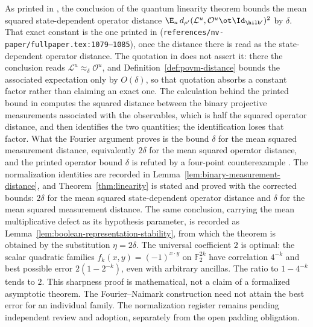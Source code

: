 \begin{remark}
	\label{rem:linearity-distance-normalization}
	As printed in \cite{Natarajan2017Linearity}, the conclusion of the quantum
	linearity theorem bounds the mean squared state-dependent operator distance
	$\E_u \, d_{\rho'}(\mathcal{L}^u, \mathcal{O}^u \ot \Id_{\hilb'})^2$ by
	$\delta$. That exact constant is the one printed in
	\cite[Theorem~10]{Natarajan2017Linearity}
	(\texttt{references/nv-paper/fullpaper.tex:1079--1085}), once the distance
	there is read as the state-dependent operator distance. The quotation in
	\cite{Ji2020MIPStar} does not assert it: there the conclusion reads
	$\mathcal{L}^u \approx_\delta \mathcal{O}^u$, and
	Definition~\ref{def:povm-distance} bounds the associated expectation only
	by $O(\delta)$, so that quotation absorbs a constant factor rather than
	claiming an exact one. The calculation behind the printed bound in
	\cite[Section~3.1]{Natarajan2017Linearity} computes the squared distance
	between the binary projective measurements associated with the
	observables, which is half the squared operator distance, and then
	identifies the two quantities; the identification loses that factor. What
	the Fourier argument proves is the bound $\delta$ for the mean squared
	measurement distance, equivalently $2\delta$ for the mean squared operator
	distance, and the printed operator bound $\delta$ is refuted by a
	four-point counterexample
	\cite{gap:qpbt_linearity-distance-normalization}. The normalization
	identities are recorded in Lemma~\ref{lem:binary-measurement-distance},
	and Theorem~\ref{thm:linearity} is stated and proved with the corrected
	bounds: $2\delta$ for the mean squared state-dependent operator distance
	and $\delta$ for the mean squared measurement distance. The same
	conclusion, carrying the mean multiplicative defect as its hypothesis
	parameter, is recorded as
	Lemma~\ref{lem:boolean-representation-stability}, from which the theorem
	is obtained by the substitution $\eta = 2\delta$. The universal
	coefficient $2$ is optimal: the scalar quadratic families
	$f_k(x,y)=(-1)^{x\cdot y}$ on $\mathbb F_2^{2k}$ have correlation
	$4^{-k}$ and best possible error $2(1-2^{-k})$, even with arbitrary
	ancillas. The ratio to $1-4^{-k}$ tends to $2$. This sharpness proof is
	mathematical, not a claim of a formalized asymptotic theorem. The
	Fourier--Naimark construction need not attain the best error for an
	individual family. The normalization register remains pending independent
	review and adoption, separately from the open padding obligation.
\end{remark}

